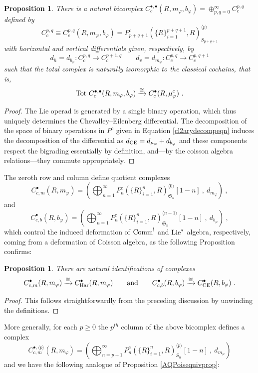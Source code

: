 \documentclass[11pt]{amsart}
\numberwithin{equation}{section}
\newtheorem{prop}[theo]{Proposition}
\theoremstyle{definition}
\newcommand{\mf}{\mathfrak}
\newcommand{\CE}{{\textup{CE}}}
\newcommand{\Comm}{{\textup{Comm}}}
\newcommand{\Lie}{{\textup{Lie}}}
\newcommand{\Ss}{{{\mf{S}}}}
\newcommand{\0}{{\textbf{0}}}
\def \mf{\mathfrak}
\begin{document}
\begin{prop}\label{Coisbicxprop} 
There is a natural bicomplex $C^{\bullet,\bullet}_c(R,m_\varphi,b_\varphi)=\oplus_{p,q=0}^\infty C^{p,q}_c$ defined by
	\[
	C^{p,q}_c\equiv C^{p,q}_c(R,m_\varphi,b_\varphi)= P_{p+q+1}^c(\{ R\}_{i=1}^{p+q+1},R)_{S_{p+q+1}}^{\langle p \rangle }
	\]
	with horizontal and vertical differentials given, respectively, by
	\[
  d_h=d_{b_\varphi}:C^{p,q}_c \to C^{p+1,q}_c \qquad d_v=d_{m_\varphi}:C^{p,q}_c \to C^{p,q+1}_c 
	\]
	such that the total complex is naturally isomorphic to the classical cochains, that is, \[\textup{Tot } C^{\bullet,\bullet}_c(R,m_\varphi,b_\varphi) \xrightarrow{\cong} C_c^\bullet(R,\mu_\varphi^c) \ .\]
\end{prop}
\begin{proof}
	The Lie operad is generated by a single binary operation, which thus uniquely determines the Chevalley--Eilenberg differential. The decomposition of the space of binary operations in $P^c$ given in Equation \ref{cl2arydecompeqn} induces the decomposition of the differential as $d_{\CE}=d_{\mu_\varphi}+d_{b_\varphi}$ and these components respect the bigrading essentially by definition, and---by the coisson algebra relations---they commute appropriately.
\end{proof}


The zeroth row and column define quotient complexes
\[ 
C^\bullet_{c,m}(R,m_\varphi)=(\bigoplus_{n=1}^\infty P_{n}^c(\{ R\}_{i=1}^{n},R)_{\Ss_{n}}^{\langle 0 \rangle }[1-n] \ , \ d_{m_\varphi} )  ~,
\]
and
\[
C^\bullet_{c,b}(R,b_\varphi)=(\bigoplus_{n=1}^\infty P_{n}^c(\{ R\}_{i=1}^{n},R)_{\Ss_{n}}^{\langle n-1 \rangle }[1-n] \ , \ d_{b_\varphi} )  ~,
\]
which control the induced deformation of $\Comm^!$ and $\Lie^*$ algebra, respectively, coming from a deformation of Coisson algebra, as the following Proposition confirms:

\begin{prop}\label{firstrcprop}There are natural identifications of complexes
	\[C^\bullet_{c,m}(R,m_\varphi) \xrightarrow{\cong} C^\bullet_{\textup{Har}}(R,m_\varphi) \qquad \text{and}\qquad  C^\bullet_{c,b}(R,b_\varphi) \xrightarrow{\cong} C^\bullet_{\textup{CE}}(R,b_\varphi)  \ . \]
\end{prop}
\begin{proof} This follows straightforwardly from the preceding discussion by unwinding the definitions.
\end{proof}



More generally, for each $p\geq 0$ the $p^{th}$ column of the above bicomplex defines a complex
\[ C^{\bullet,\langle p \rangle}_{c,m}(R,m_\varphi)=(\bigoplus_{n=p+1}^\infty P_{n}^c(\{ R\}_{i=1}^{n},R)_{S_{n}}^{\langle p \rangle }[1-n] \ , \ d_{m_\varphi} ) \]
and we have the following analogue of Proposition \ref{AQPoisequivprop}:
\end{document}
